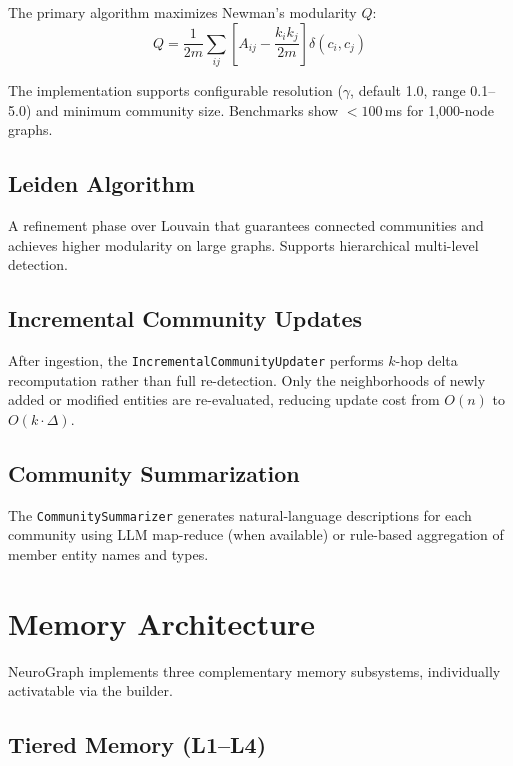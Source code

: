 \documentclass[11pt,twocolumn]{article}
\begin{document}
The primary algorithm maximizes Newman's modularity $Q$:
\begin{equation}
Q = \frac{1}{2m}\sum_{ij}\left[A_{ij} - \frac{k_i k_j}{2m}\right]\delta(c_i, c_j)
\end{equation}

The implementation supports configurable resolution ($\gamma$, default 1.0, range 0.1--5.0) and minimum community size. Benchmarks show $<100$\,ms for 1{,}000-node graphs.

\subsection{Leiden Algorithm}

A refinement phase over Louvain that guarantees connected communities and achieves higher modularity on large graphs. Supports hierarchical multi-level detection.

\subsection{Incremental Community Updates}

After ingestion, the \texttt{IncrementalCommunityUpdater} performs $k$-hop delta recomputation rather than full re-detection. Only the neighborhoods of newly added or modified entities are re-evaluated, reducing update cost from $O(n)$ to $O(k \cdot \Delta)$.

\subsection{Community Summarization}

The \texttt{CommunitySummarizer} generates natural-language descriptions for each community using LLM map-reduce (when available) or rule-based aggregation of member entity names and types.

\section{Memory Architecture}
\label{sec:memory}

NeuroGraph implements three complementary memory subsystems, individually activatable via the builder.

\subsection{Tiered Memory (L1--L4)}
\end{document}
